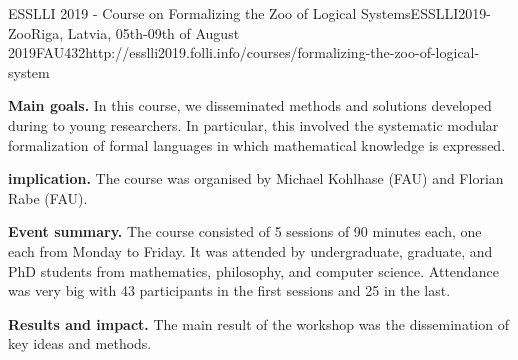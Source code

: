 \begin{event}{ESSLLI 2019 - Course on Formalizing the Zoo of Logical Systems}{ESSLLI2019-Zoo}{Riga, Latvia, 05th-09th of August 2019}{FAU}{43}{2}{http://esslli2019.folli.info/courses/formalizing-the-zoo-of-logical-system}

\textbf{Main goals.}
In this course, we disseminated methods and solutions developed during \ODK to young researchers.
In particular, this involved the systematic modular formalization of formal languages in which mathematical knowledge is expressed.

\textbf{\ODK implication.}
The course was organised by Michael Kohlhase (FAU) and Florian Rabe (FAU).

\textbf{Event summary.}
The course consisted of 5 sessions of 90 minutes each, one each from Monday to Friday.
It was attended by undergraduate, graduate, and PhD students from mathematics, philosophy, and computer science.
Attendance was very big with 43 participants in the first sessions and 25 in the last.

\textbf{Results and impact.}
The main result of the workshop was the dissemination of key \ODK ideas and methods.
\end{event}
